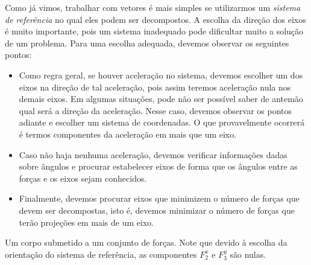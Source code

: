 Como já vimos, trabalhar com vetores é mais simples se utilizarmos um \emph{sistema de referência} no qual eles podem ser decompostos. A escolha da direção dos eixos é muito importante, pois um sistema inadequado pode dificultar muito a solução de um problema. Para uma escolha adequada, devemos observar os seguintes pontos:
\begin{itemize}
    \item Como regra geral, se houver aceleração no sistema, devemos escolher um dos eixos na direção de tal aceleração, pois assim teremos aceleração nula nos demais eixos. Em algumas situações, pode não ser possível saber de antemão qual será a direção da aceleração. Nesse caso, devemos observar os pontos adiante e escolher um sistema de coordenadas. O que provavelmente ocorrerá é termos componentes da aceleração em mais que um eixo.
    \item Caso não haja nenhuma aceleração, devemos verificar informações dadas sobre ângulos e procurar estabelecer eixos de forma que os ângulos entre as forças e os eixos sejam conhecidos.
    \item Finalmente, devemos procurar eixos que minimizem o número de forças que devem ser decompostas, isto é, devemos minimizar o número de forças que terão projeções em mais de um eixo.
\end{itemize}

\begin{marginfigure}[3cm]
\centering
{}
\caption{Um corpo submetido a um conjunto de forças. Note que devido à escolha da orientação do sistema de referência, as componentes $F_2^x$ e $F_3^y$ são nulas.\label{Fig:ExemploSisRefDecompForcas}}
\end{marginfigure}


